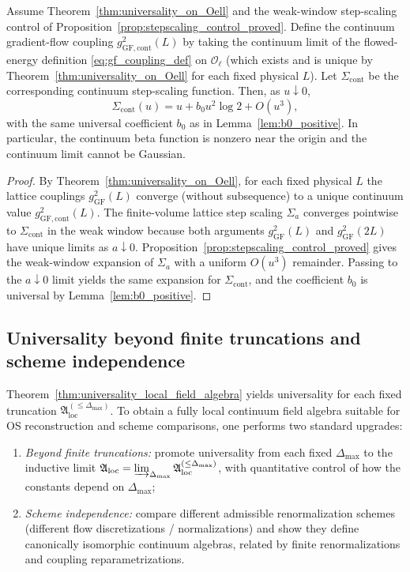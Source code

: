\begin{proposition}\label{prop:continuum_stepscaling_b0}
Assume Theorem~\ref{thm:universality_on_Oell} and the weak-window step-scaling control of Proposition~\ref{prop:stepscaling_control_proved}.
Define the continuum gradient-flow coupling $g^2_{\mathrm{GF,cont}}(L)$ by taking the continuum limit of the flowed-energy definition
\eqref{eq:gf_coupling_def} on $\mathcal O_{\ell}$ (which exists and is unique by Theorem~\ref{thm:universality_on_Oell} for each fixed physical $L$).
Let $\Sigma_{\mathrm{cont}}$ be the corresponding continuum step-scaling function.
Then, as $u\downarrow 0$,
\[
\Sigma_{\mathrm{cont}}(u)=u+b_0u^2\log 2 + O(u^3),
\]
with the same universal coefficient $b_0$ as in Lemma~\ref{lem:b0_positive}.
In particular, the continuum beta function is nonzero near the origin and the continuum limit cannot be Gaussian.
\end{proposition}

\begin{proof}
By Theorem~\ref{thm:universality_on_Oell}, for each fixed physical $L$ the lattice couplings $g^2_{\mathrm{GF}}(L)$ converge (without subsequence)
to a unique continuum value $g^2_{\mathrm{GF,cont}}(L)$.
The finite-volume lattice step scaling $\Sigma_a$ converges pointwise to $\Sigma_{\mathrm{cont}}$ in the weak window because both arguments
$g^2_{\mathrm{GF}}(L)$ and $g^2_{\mathrm{GF}}(2L)$ have unique limits as $a\downarrow 0$.
Proposition~\ref{prop:stepscaling_control_proved} gives the weak-window expansion of $\Sigma_a$ with a uniform $O(u^3)$ remainder.
Passing to the $a\downarrow 0$ limit yields the same expansion for $\Sigma_{\mathrm{cont}}$, and the coefficient $b_0$ is universal by
Lemma~\ref{lem:b0_positive}.
\end{proof}


\subsection{Universality beyond finite truncations and scheme independence}
\label{sec:universality_beyond_truncations}

Theorem~\ref{thm:universality_local_field_algebra} yields universality for each fixed truncation
$\mathfrak A_{\mathrm{loc}}^{(\le \Delta_{\max})}$.
To obtain a fully local continuum field algebra suitable for OS reconstruction and scheme comparisons, one performs two standard upgrades:

\begin{enumerate}[leftmargin=*]
\item \emph{Beyond finite truncations:} promote universality from each fixed $\Delta_{\max}$ to the inductive limit
 $\mathfrak A_{\mathrm{loc}}=\varinjlim_{\Delta_{\max}}\mathfrak A_{\mathrm{loc}}^{(\le\Delta_{\max})}$, with quantitative control of how the
 constants depend on $\Delta_{\max}$;
\item \emph{Scheme independence:} compare different admissible renormalization schemes (different flow discretizations / normalizations) and show they
 define canonically isomorphic continuum algebras, related by finite renormalizations and coupling reparametrizations.
\end{enumerate}

